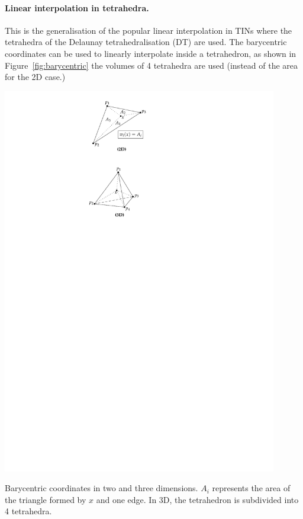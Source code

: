 \paragraph{Linear interpolation in tetrahedra.}
This is the generalisation of the popular linear interpolation in TINs where the tetrahedra of the Delaunay tetrahedralisation (DT) are used. 
The barycentric coordinates can be used to linearly interpolate inside a tetrahedron, as shown in Figure~\ref{fig:barycentric} the volumes of 4 tetrahedra are used (instead of the area for the 2D case.)
\begin{marginfigure}
  \centering
  \includegraphics[width=0.9\textwidth]{figs/barycentric}
  \caption[Barycentric coordinates in two and three dimensions]{Barycentric coordinates in two and three dimensions. $A_i$ represents the area of the triangle formed by $x$ and one edge. In 3D, the tetrahedron is subdivided into 4 tetrahedra.}%
\label{fig:barycentric}
\end{marginfigure}

